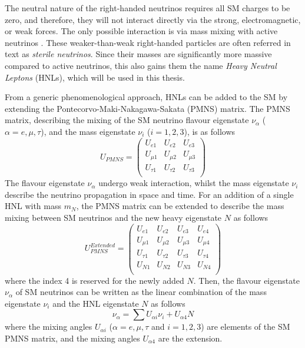The neutral nature of the right-handed neutrinos requires all SM charges to be zero, and therefore, they will not interact directly via the strong, electromagnetic, or weak forces.
The only possible interaction is via mass mixing with active neutrinos \cite{SBNHNL}.
These weaker-than-weak right-handed particles are often referred in text as \textit{sterile neutrinos}.
Since their masses are significantly more massive compared to active neutrinos, this also gains them the name \textit{Heavy Neutral Leptons} (HNLs), which will be used in this thesis.

From a generic phenomenological approach, HNLs can be added to the SM by extending the Pontecorvo-Maki-Nakagawa-Sakata (PMNS) matrix.
The PMNS matrix, describing the mixing of the SM neutrino flavour eigenstate $\nu_{\alpha}$ ($\alpha=e,\mu,\tau$), and the mass eigenstate $\nu_{i}$ ($i=1,2,3$), is as follows 
\begin{equation}
	U_{PMNS} =
	\begin{pmatrix}
		U_{e1} & U_{e2} & U_{e3}\\
		U_{\mu1} & U_{\mu2} & U_{\mu3}\\
		U_{\tau1} & U_{\tau2} & U_{\tau3}\\
	\end{pmatrix}
\end{equation}
The flavour eigenstate $\nu_{\alpha}$ undergo weak interaction, whilst the mass eigenstate $\nu_{i}$ describe the neutrino propagation in space and time.
For an addition of a single HNL with mass $m_{N}$, the PMNS matrix can be extended to describe the mass mixing between SM neutrinos and the new heavy eigenstate $N$ as follows 
\begin{equation}
	U_{PMNS}^{Extended} =
	\begin{pmatrix}
		U_{e1} & U_{e2} & U_{e3} & U_{e4}\\
		U_{\mu1} & U_{\mu2} & U_{\mu3} & U_{\mu4}\\
		U_{\tau1} & U_{\tau2} & U_{\tau3} & U_{\tau4}\\
		U_{N1} & U_{N2} & U_{N3} & U_{N4}\\
	\end{pmatrix}
\end{equation}
where the index 4 is reserved for the newly added $N$.
Then, the flavour eigenstate  $\nu_{\alpha}$ of SM neutrinos can be written as the linear combination of the mass eigenstate $\nu_{i}$ and the HNL eigenstate $N$ as follows 
\begin{equation}
	\nu_{\alpha}=\sum U_{\alpha i}\nu_{i} + U_{\alpha 4}N
\end{equation}
where the mixing angles $U_{\alpha i }$ ($\alpha=e,\mu,\tau$ and $i=1,2,3$) are elements of the SM PMNS matrix, and the mixing angles $U_{\alpha 4}$ are the extension.

